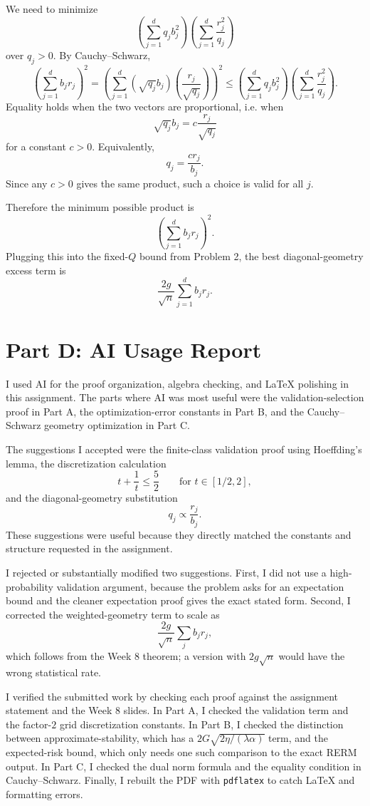 \documentclass{article}
\begin{document}
We need to minimize
$$
\left(\sum_{j=1}^d q_jb_j^2\right)
\left(\sum_{j=1}^d \frac{r_j^2}{q_j}\right)
$$
over $q_j>0$. By Cauchy--Schwarz,
$$
\left(\sum_{j=1}^d b_jr_j\right)^2
=
\left(\sum_{j=1}^d (\sqrt{q_j}b_j)\left(\frac{r_j}{\sqrt{q_j}}\right)\right)^2
\le
\left(\sum_{j=1}^d q_jb_j^2\right)
\left(\sum_{j=1}^d \frac{r_j^2}{q_j}\right).
$$
Equality holds when the two vectors are proportional, i.e. when
$$
\sqrt{q_j}b_j
=
c\frac{r_j}{\sqrt{q_j}}
$$
for a constant $c>0$. Equivalently,
$$
q_j=\frac{c r_j}{b_j}.
$$
Since any $c>0$ gives the same product, such a choice is valid for all $j$.

Therefore the minimum possible product is
$$
\left(\sum_{j=1}^d b_jr_j\right)^2.
$$
Plugging this into the fixed-$Q$ bound from Problem 2, the best diagonal-geometry excess term is
$$
\frac{2g}{\sqrt n}\sum_{j=1}^d b_jr_j.
$$

\newpage
\section{Part D: AI Usage Report}

I used AI for the proof organization, algebra checking, and LaTeX polishing in this assignment. The parts where AI was most useful were the validation-selection proof in Part A, the optimization-error constants in Part B, and the Cauchy--Schwarz geometry optimization in Part C.

The suggestions I accepted were the finite-class validation proof using Hoeffding's lemma, the discretization calculation
$$
t+\frac1t\le \frac52
\qquad
\text{for }t\in[1/2,2],
$$
and the diagonal-geometry substitution
$$
q_j\propto \frac{r_j}{b_j}.
$$
These suggestions were useful because they directly matched the constants and structure requested in the assignment.

I rejected or substantially modified two suggestions. First, I did not use a high-probability validation argument, because the problem asks for an expectation bound and the cleaner expectation proof gives the exact stated form. Second, I corrected the weighted-geometry term to scale as
$$
\frac{2g}{\sqrt n}\sum_j b_jr_j,
$$
which follows from the Week 8 theorem; a version with $2g\sqrt n$ would have the wrong statistical rate.

I verified the submitted work by checking each proof against the assignment statement and the Week 8 slides. In Part A, I checked the validation term and the factor-$2$ grid discretization constants. In Part B, I checked the distinction between approximate-stability, which has a $2G\sqrt{2\eta/(\lambda\alpha)}$ term, and the expected-risk bound, which only needs one such comparison to the exact RERM output. In Part C, I checked the dual norm formula and the equality condition in Cauchy--Schwarz. Finally, I rebuilt the PDF with \verb|pdflatex| to catch LaTeX and formatting errors.
\end{document}
